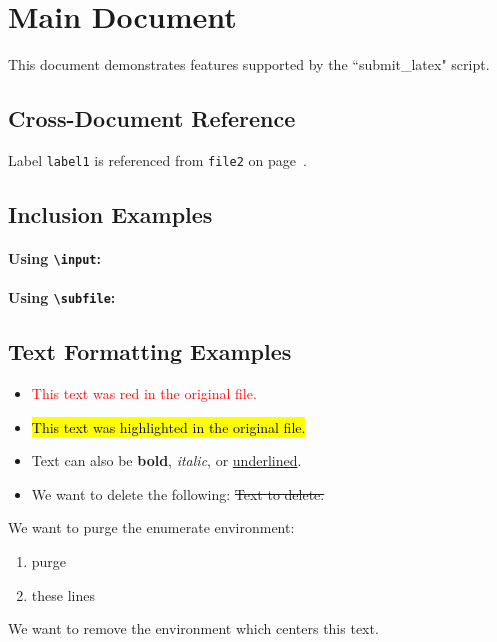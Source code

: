 \documentclass{article}
\begin{document}
\section{Main Document}
This document demonstrates features supported by the ``submit\_latex" script.

\subsection{Cross-Document Reference}
Label \texttt{label1} is referenced from \texttt{file2} on page~\pageref{label1}.

\subsection{Inclusion Examples}
\paragraph{Using \texttt{\textbackslash input}:}


\paragraph{Using \texttt{\textbackslash subfile}:}


\subsection{Text Formatting Examples}
\begin{itemize}
\item \textcolor{red}{This text was red in the original file.}
\item \hl{This text was highlighted in the original file.}
\item Text can also be \textbf{bold}, \textit{italic}, or \underline{underlined}.
\item We want to delete the following: \st{Text to delete.}
\end{itemize}

We want to purge the enumerate environment:
\begin{enumerate}
\item purge
\item these lines
\end{enumerate}

\begin{center}
We want to remove the environment which centers this text.
\end{center}
\end{document}
